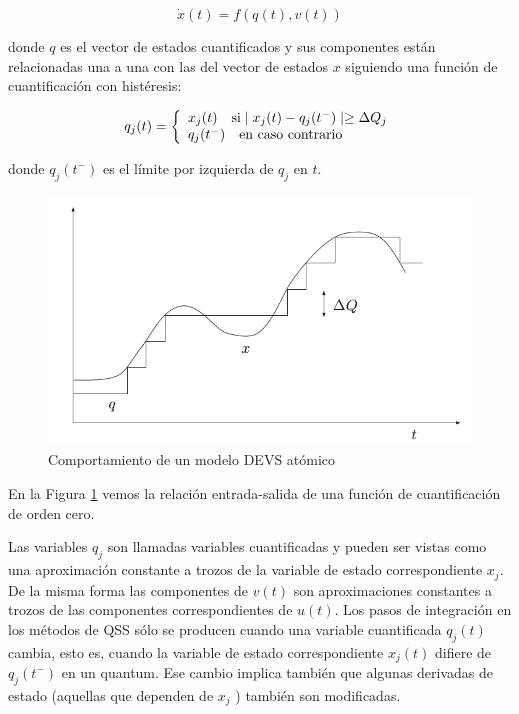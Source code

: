 	\begin{equation}
	\dot{x}(t) = f (q(t), v(t))
	\end{equation}
	
	donde $q$ es el vector de estados cuantificados y sus componentes están relacionadas una a una con las del vector de estados $x$ siguiendo una 
	función de cuantificación con histéresis:
	
	\begin{equation}
	q_j(t) = \left\{ 
	  \begin{array}{l l}
	    x_j(t)  \quad \text{si} \mid x_j (t ) - q_j (t^{-} ) \mid \geq \Delta Q_j \\
	    q_j (t^{-} ) \quad \text{en caso contrario}
	  \end{array} \right.
	\end{equation}
	
	donde $q_j (t^{-})$ es el límite por izquierda de $q_j$ en $t$.
	
	\begin{figure}[!htbp]
	  \includegraphics[scale=0.5]{histeresis1}
	  \caption{Comportamiento de un modelo DEVS atómico}
	   \label{fig:fig2-2}
	\end{figure}
	
	En la Figura \ref{fig:fig2-2} vemos la relación entrada-salida de una función de cuantificación de orden cero.
	
	Las variables $q_j$ son llamadas variables cuantificadas y pueden ser vistas como una aproximación constante a trozos de la variable de estado 
	correspondiente $x_j$. De la misma forma las componentes de $v(t)$ son aproximaciones constantes a trozos de las componentes correspondientes de $u(t)$. 
	Los pasos de integración en los métodos de QSS sólo se producen cuando una variable cuantificada $q_j (t)$ cambia, esto es, cuando la variable de 
	estado correspondiente $x_j (t)$ difiere de $q_j(t^{-})$ en un quantum. Ese cambio implica también que algunas derivadas de estado (aquellas que 
	dependen de $x_j$ ) también son modificadas. 

